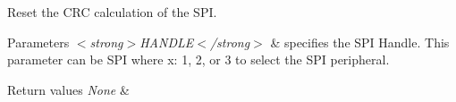 Reset the C\+RC calculation of the S\+PI. 


\begin{DoxyParams}{Parameters}
{\em $<$strong$>$\+H\+A\+N\+D\+L\+E$<$/strong$>$} & specifies the S\+PI Handle. This parameter can be S\+PI where x\+: 1, 2, or 3 to select the S\+PI peripheral. \\
\hline
\end{DoxyParams}

\begin{DoxyRetVals}{Return values}
{\em None} & \\
\hline
\end{DoxyRetVals}
